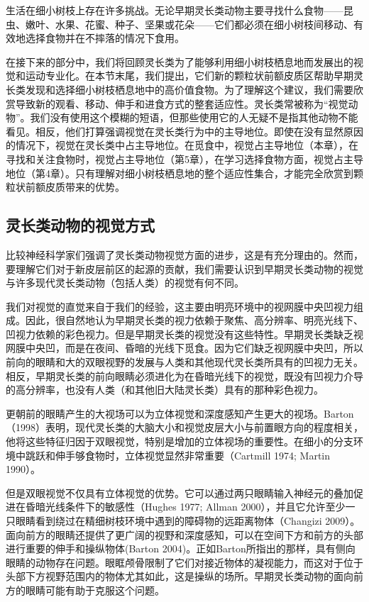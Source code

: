 生活在细小树枝上存在许多挑战。无论早期灵长类动物主要寻找什么食物——昆虫、嫩叶、水果、花蜜、种子、坚果或花朵——它们都必须在细小树枝间移动、有效地选择食物并在不摔落的情况下食用。

在接下来的部分中，我们将回顾灵长类为了能够利用细小树枝栖息地而发展出的视觉和运动专业化。在本节末尾，我们提出，它们新的颗粒状前额皮质区帮助早期灵长类发现和选择细小树枝栖息地中的高价值食物。为了理解这个建议，我们需要欣赏导致新的观看、移动、伸手和进食方式的整套适应性。灵长类常被称为“视觉动物”。我们没有使用这个模糊的短语，但那些使用它的人无疑不是指其他动物不能看见。相反，他们打算强调视觉在灵长类行为中的主导地位。即使在没有显然原因的情况下，视觉在灵长类中占主导地位。在觅食中，视觉占主导地位（本章），在寻找和关注食物时，视觉占主导地位（第5章），在学习选择食物方面，视觉占主导地位（第4章）。只有理解对细小树枝栖息地的整个适应性集合，才能完全欣赏到颗粒状前额皮质带来的优势。

\subsection{灵长类动物的视觉方式}
比较神经科学家们强调了灵长类动物视觉方面的进步，这是有充分理由的。然而，要理解它们对于新皮层前区的起源的贡献，我们需要认识到早期灵长类动物的视觉与许多现代灵长类动物（包括人类）的视觉有何不同。

我们对视觉的直觉来自于我们的经验，这主要由明亮环境中的视网膜中央凹视力组成。因此，很自然地认为早期灵长类的视力依赖于聚焦、高分辨率、明亮光线下、凹视力依赖的彩色视力。但是早期灵长类的视觉没有这些特性。早期灵长类缺乏视网膜中央凹，而是在夜间、昏暗的光线下觅食。因为它们缺乏视网膜中央凹，所以前向的眼睛和大的双眼视野的发展与人类和其他现代灵长类所具有的凹视力无关。相反，早期灵长类的前向眼睛必须进化为在昏暗光线下的视觉，既没有凹视力介导的高分辨率，也没有人类（和其他旧大陆灵长类）具有的那种彩色视力。

更朝前的眼睛产生的大视场可以为立体视觉和深度感知产生更大的视场。Barton（1998）表明，现代灵长类的大脑大小和视觉皮层大小与前置眼方向的程度相关，他将这些特征归因于双眼视觉，特别是增加的立体视场的重要性。在细小的分支环境中跳跃和伸手够食物时，立体视觉显然非常重要（Cartmill 1974; Martin 1990）。

但是双眼视觉不仅具有立体视觉的优势。它可以通过两只眼睛输入神经元的叠加促进在昏暗光线条件下的敏感性（Hughes 1977; Allman 2000），并且它允许至少一只眼睛看到绕过在精细树枝环境中遇到的障碍物的远距离物体（Changizi 2009）。面向前方的眼睛还提供了更广阔的视野和深度感知，可以在空间下方和前方的头部进行重要的伸手和操纵物体(Barton 2004)。正如Barton所指出的那样，具有侧向眼睛的动物存在问题。眼眶颅骨限制了它们对接近物体的凝视能力，而这对于位于头部下方视野范围内的物体尤其如此，这是操纵的场所。早期灵长类动物的面向前方的眼睛可能有助于克服这个问题。

